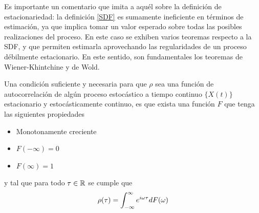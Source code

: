 %



Es importante un comentario que imita a aqu\'el sobre la definici\'on de estacionariedad:
la definici\'on \ref{SDF} es sumamente ineficiente en t\'erminos de estimaci\'on, ya que implica
tomar un valor esperado sobre todas las posibles realizaciones del proceso.
En este caso se exhiben varios teoremas respecto a la SDF, y que permiten estimarla aprovechando
las regularidades de un proceso d\'ebilmente estacionario. 
En este sentido, son fundamentales los teoremas de Wiener-Khintchine y de Wold.

\begin{thrm}
Una condici\'on suficiente y necesaria para que $\rho$ sea una funci\'on de autocorrelaci\'on de 
alg\'un proceso estoc\'astico a tiempo continuo $\{X(t)\}$ estacionario y estoc\'asticamente 
continuo, es que exista una funci\'on $F$ que tenga las 
siguientes propiedades
\begin{itemize}
\item Monotonamente creciente
\item $F(-\infty) = 0$
\item $F(\infty) = 1$
\end{itemize}
y tal que para todo $\tau \in \mathbb{R}$ se cumple que
\begin{equation*}
\rho(\tau) = \int_{-\infty}^{\infty} e^{i \omega \tau} dF(\omega)
\end{equation*}
\end{thrm}

